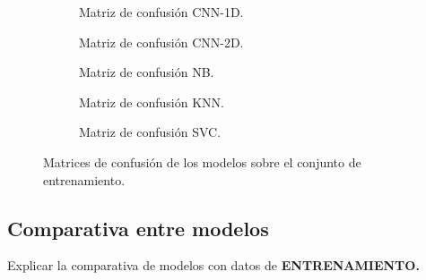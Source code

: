     \begin{figure}
        \centering
        \begin{subfigure}[b]{0.4\textwidth}
            \centering
            
            \caption{Matriz de confusión CNN-1D.}
            \label{ConfusionMatrixTestImages:1D}
        \end{subfigure}
        \begin{subfigure}[b]{0.4\textwidth}
            \centering
            
            \caption{Matriz de confusión CNN-2D.} 
            \label{ConfusionMatrixTestImages:2D}

        \end{subfigure}
        \begin{subfigure}[b]{0.4\textwidth}
            \centering
            
            \caption{Matriz de confusión NB.}
            \label{ConfusionMatrixTestImages:NB}
        \end{subfigure}

        \begin{subfigure}[b]{0.4\textwidth}
            \centering
            
            \caption{Matriz de confusión KNN.}
            \label{ConfusionMatrixTestImages:KNN}
        \end{subfigure}

        \begin{subfigure}[b]{0.4\textwidth}
            \centering
            
            \caption{Matriz de confusión SVC.}
            \label{ConfusionMatrixTestImages:SVC}
        \end{subfigure}

        \caption{Matrices de confusión de los modelos sobre el conjunto de entrenamiento.}
        \label{ConfusionMatrixTestImages}
     \end{figure}

  \subsection{Comparativa entre modelos}

    Explicar la comparativa de modelos con datos de \textbf{ENTRENAMIENTO.}


